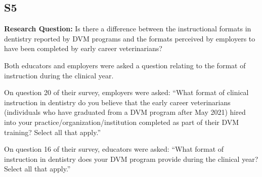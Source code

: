 \documentclass[
  12pt,
  letterpaper,
  DIV=11,
  numbers=noendperiod]{scrartcl}
\numberwithin{figure}{section}
\numberwithin{table}{section}
\begin{document}
\begin{table}[!h]
\centering
\caption{Mann-Whitney U Test: Expected Dental Procedures by Group and Setting}
\centering
{}
\end{table}

\subsection{S5}\label{s5}

\textbf{Research Question:} Is there a difference between the
instructional formats in dentistry reported by DVM programs and the
formats perceived by employers to have been completed by early career
veterinarians?

Both educators and employers were asked a question relating to the
format of instruction during the clinical year.

On question 20 of their survey, employers were asked: ``What format of
clinical instruction in dentistry do you believe that the early career
veterinarians (individuals who have graduated from a DVM program after
May 2021) hired into your practice/organization/institution completed as
part of their DVM training? Select all that apply.''

On question 16 of their survey, educators were asked: ``What format of
instruction in dentistry does your DVM program provide during the
clinical year? Select all that apply.''
\end{document}
